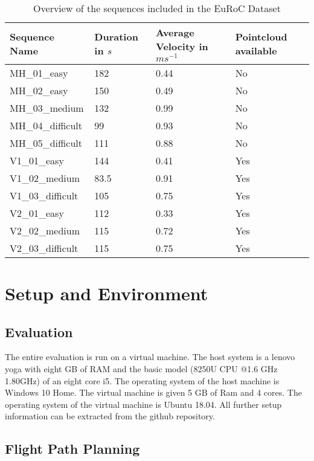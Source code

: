 	\begin{table}
	\caption{Overview of the sequences included in the EuRoC Dataset}
	\begin{tabular}{ |p{3cm}||p{3cm}|p{3cm}|p{3cm}|}
	\hline
	Sequence Name& Duration in $s$ & Average Velocity in $ms^{-1}$ &Pointcloud available\\
	\hline
	MH\_01\_easy & 182 & 0.44 & No\\
	MH\_02\_easy & 150 & 0.49 & No\\
	MH\_03\_medium & 132 & 0.99 & No\\
	MH\_04\_difficult & 99 & 0.93 & No\\
	MH\_05\_difficult & 111 & 0.88 & No\\
	V1\_01\_easy & 144 & 0.41 & Yes\\
	V1\_02\_medium & 83.5 & 0.91 & Yes\\
	V1\_03\_difficult & 105 & 0.75 & Yes\\
	V2\_01\_easy & 112 & 0.33 & Yes\\
	V2\_02\_medium & 115 & 0.72 & Yes\\
	V2\_03\_difficult & 115 & 0.75 & Yes\\
	\hline
	\end{tabular}
	\label{table:euroctable}
	\end{table}
	
\section{Setup and Environment}

	\subsection{Evaluation}
	
	The entire evaluation is run on a virtual machine. The host system is a lenovo yoga with eight GB of RAM and the basic model (8250U CPU @1.6 
	GHz 1.80GHz) of an eight core i5. The operating system of the host machine is Windows 10 Home. The virtual
	machine is given 5 GB of Ram and 4 cores. The operating system of the virtual machine is Ubuntu 18.04. All further setup information can be extracted 
	from the github repository.

	\subsection{Flight Path Planning}
 
 